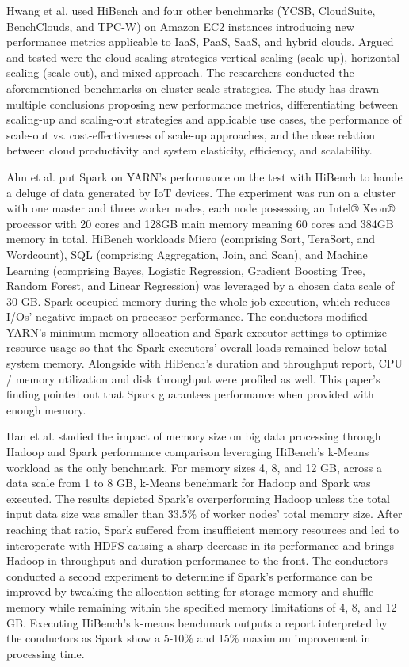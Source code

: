 \documentclass[review]{elsarticle}
\begin{document}
Hwang et al. \cite{hwang_cloud_2016} used HiBench and four other benchmarks (YCSB, CloudSuite, BenchClouds, and TPC-W) on Amazon EC2 instances introducing new performance metrics applicable to IaaS, PaaS, SaaS, and hybrid clouds. Argued and tested were the cloud scaling strategies vertical scaling (scale-up), horizontal scaling (scale-out), and mixed approach. The researchers conducted the aforementioned benchmarks on cluster scale strategies. The study has drawn multiple conclusions proposing new performance metrics, differentiating between scaling-up and scaling-out strategies and applicable use cases, the performance of scale-out vs. cost-effectiveness of scale-up approaches, and the close relation between cloud productivity and system elasticity, efficiency, and scalability.

Ahn et al. \cite{ahn_performance_2018} put Spark on YARN's performance on the test with HiBench to hande a deluge of data generated by IoT devices. The experiment was run on a cluster with one master and three worker nodes, each node possessing an Intel® Xeon® processor with 20 cores and 128GB main memory meaning 60 cores and 384GB memory in total. HiBench workloads Micro (comprising Sort, TeraSort, and Wordcount), SQL (comprising Aggregation, Join, and Scan), and Machine Learning (comprising Bayes, Logistic Regression, Gradient Boosting Tree, Random Forest, and Linear Regression) was leveraged by a chosen data scale of 30 GB. Spark occupied memory during the whole job execution, which reduces I/Os' negative impact on processor performance. The conductors modified YARN's minimum memory allocation and Spark executor settings to optimize resource usage so that the Spark executors' overall loads remained below total system memory. Alongside with HiBench's duration and throughput report, CPU / memory utilization and disk throughput were profiled as well. This paper's finding pointed out that Spark guarantees performance when provided with enough memory.

Han et al. \cite{han_impact_2017} studied the impact of memory size on big data processing through Hadoop and Spark performance comparison leveraging HiBench's k-Means workload as the only benchmark. For memory sizes 4, 8, and 12 GB, across a data scale from 1 to 8 GB, k-Means benchmark for Hadoop and Spark was executed. The results depicted Spark's overperforming Hadoop unless the total input data size was smaller than 33.5\% of worker nodes' total memory size. After reaching that ratio, Spark suffered from insufficient memory resources and led to interoperate with HDFS causing a sharp decrease in its performance and brings Hadoop in throughput and duration performance to the front. The conductors conducted a second experiment to determine if Spark's performance can be improved by tweaking the allocation setting for storage memory and shuffle memory while remaining within the specified memory limitations of 4, 8, and 12 GB. Executing HiBench's k-means benchmark outputs a report interpreted by the conductors as Spark show a 5-10\% and 15\% maximum improvement in processing time.
\end{document}

